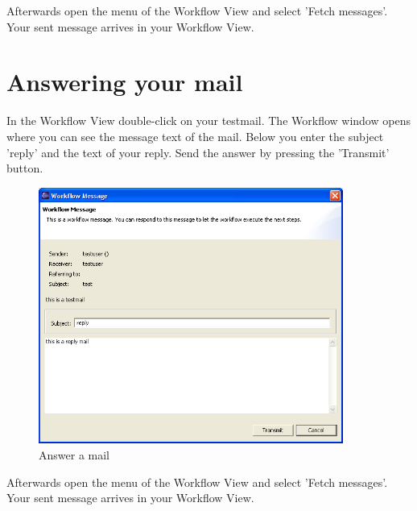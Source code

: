 Afterwards open the menu of the Workflow View and select 'Fetch messages'. Your sent
message arrives in your Workflow View.

\section{Answering your mail}

In the Workflow View double-click on your testmail. The Workflow
window opens where you can see the message text of the mail. Below you enter
the subject 'reply' and the text of your reply. Send the answer by pressing the 'Transmit' 
button. 

\begin{figure}[h!]
\begin{center}
\includegraphics[width=10cm]{tutorial17.png}
   \caption{Answer a mail}
\end{center}
\end{figure}\par

Afterwards open the menu of the Workflow View and select 'Fetch messages'. Your sent
message arrives in your Workflow View.





